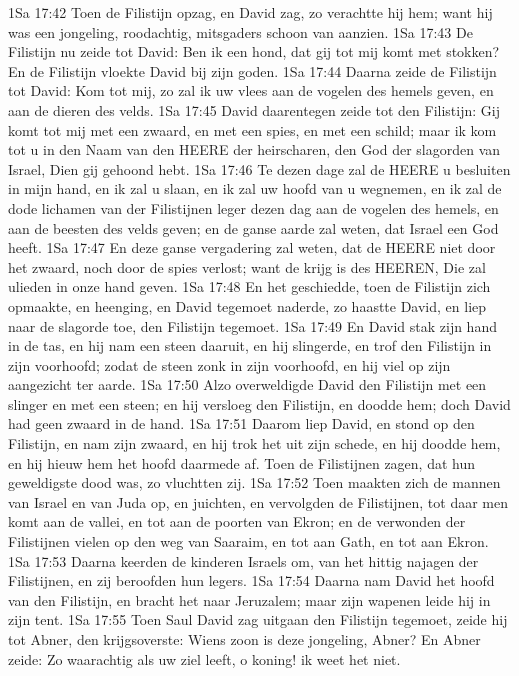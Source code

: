 1Sa 17:42  Toen de Filistijn opzag, en David zag, zo verachtte hij hem; want hij was een jongeling, roodachtig, mitsgaders schoon van aanzien.
1Sa 17:43  De Filistijn nu zeide tot David: Ben ik een hond, dat gij tot mij komt met stokken? En de Filistijn vloekte David bij zijn goden.
1Sa 17:44  Daarna zeide de Filistijn tot David: Kom tot mij, zo zal ik uw vlees aan de vogelen des hemels geven, en aan de dieren des velds.
1Sa 17:45  David daarentegen zeide tot den Filistijn: Gij komt tot mij met een zwaard, en met een spies, en met een schild; maar ik kom tot u in den Naam van den HEERE der heirscharen, den God der slagorden van Israel, Dien gij gehoond hebt.
1Sa 17:46  Te dezen dage zal de HEERE u besluiten in mijn hand, en ik zal u slaan, en ik zal uw hoofd van u wegnemen, en ik zal de dode lichamen van der Filistijnen leger dezen dag aan de vogelen des hemels, en aan de beesten des velds geven; en de ganse aarde zal weten, dat Israel een God heeft.
1Sa 17:47  En deze ganse vergadering zal weten, dat de HEERE niet door het zwaard, noch door de spies verlost; want de krijg is des HEEREN, Die zal ulieden in onze hand geven.
1Sa 17:48  En het geschiedde, toen de Filistijn zich opmaakte, en heenging, en David tegemoet naderde, zo haastte David, en liep naar de slagorde toe, den Filistijn tegemoet.
1Sa 17:49  En David stak zijn hand in de tas, en hij nam een steen daaruit, en hij slingerde, en trof den Filistijn in zijn voorhoofd; zodat de steen zonk in zijn voorhoofd, en hij viel op zijn aangezicht ter aarde.
1Sa 17:50  Alzo overweldigde David den Filistijn met een slinger en met een steen; en hij versloeg den Filistijn, en doodde hem; doch David had geen zwaard in de hand.
1Sa 17:51  Daarom liep David, en stond op den Filistijn, en nam zijn zwaard, en hij trok het uit zijn schede, en hij doodde hem, en hij hieuw hem het hoofd daarmede af. Toen de Filistijnen zagen, dat hun geweldigste dood was, zo vluchtten zij.
1Sa 17:52  Toen maakten zich de mannen van Israel en van Juda op, en juichten, en vervolgden de Filistijnen, tot daar men komt aan de vallei, en tot aan de poorten van Ekron; en de verwonden der Filistijnen vielen op den weg van Saaraim, en tot aan Gath, en tot aan Ekron.
1Sa 17:53  Daarna keerden de kinderen Israels om, van het hittig najagen der Filistijnen, en zij beroofden hun legers.
1Sa 17:54  Daarna nam David het hoofd van den Filistijn, en bracht het naar Jeruzalem; maar zijn wapenen leide hij in zijn tent.
1Sa 17:55  Toen Saul David zag uitgaan den Filistijn tegemoet, zeide hij tot Abner, den krijgsoverste: Wiens zoon is deze jongeling, Abner? En Abner zeide: Zo waarachtig als uw ziel leeft, o koning! ik weet het niet.
